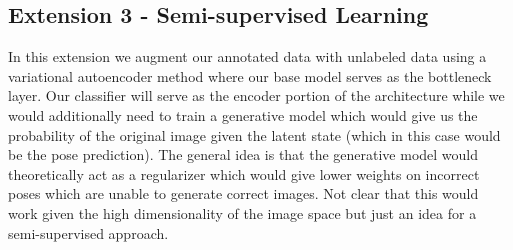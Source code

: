 \documentclass[12pt]{article}
\begin{document}
\subsection{Extension 3 - Semi-supervised Learning}

In this extension we augment our annotated data with unlabeled data using a variational autoencoder method where our base model serves as the bottleneck layer. Our classifier will serve as the encoder portion of the architecture while we would additionally need to train a generative model which would give us the probability of the original image given the latent state (which in this case would be the pose prediction). The general idea is that the generative model would theoretically act as a regularizer which would give lower weights on incorrect poses which are unable to generate correct images. Not clear that this would work given the high dimensionality of the image space but just an idea for a semi-supervised approach.\\

\begin{center}
\end{center}

\nocite{*}


\end{document}
